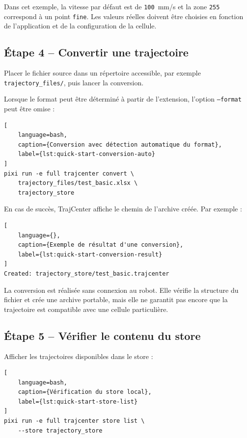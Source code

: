 \documentclass{rapportENSAM}
\begin{document}
Dans cet exemple, la vitesse par défaut est de \texttt{100}~mm/s et la zone \texttt{255} correspond à un point \texttt{fine}. Les valeurs réelles doivent être choisies en fonction de
l'application et de la configuration de la cellule.

\subsection{Étape 4 -- Convertir une trajectoire}
\label{subsec:quick-start-conversion}

Placer le fichier source dans un répertoire accessible, par exemple \texttt{trajectory\_files/}, puis lancer la conversion.

Lorsque le format peut être déterminé à partir de l'extension, l'option \texttt{--format} peut être omise :

\begin{lstlisting}[
    language=bash,
    caption={Conversion avec détection automatique du format},
    label={lst:quick-start-conversion-auto}
]
pixi run -e full trajcenter convert \
    trajectory_files/test_basic.xlsx \
    trajectory_store
\end{lstlisting}

En cas de succès, TrajCenter affiche le chemin de l'archive créée. Par exemple :

\begin{lstlisting}[
    language={},
    caption={Exemple de résultat d'une conversion},
    label={lst:quick-start-conversion-result}
]
Created: trajectory_store/test_basic.trajcenter
\end{lstlisting}

La conversion est réalisée sans connexion au robot. Elle vérifie la structure du fichier et crée une archive portable, mais elle ne garantit pas encore que la trajectoire est compatible avec une cellule particulière.

\subsection{Étape 5 -- Vérifier le contenu du store}
\label{subsec:quick-start-store-check}

Afficher les trajectoires disponibles dans le store :

\begin{lstlisting}[
    language=bash,
    caption={Vérification du store local},
    label={lst:quick-start-store-list}
]
pixi run -e full trajcenter store list \
    --store trajectory_store
\end{lstlisting}
\end{document}
